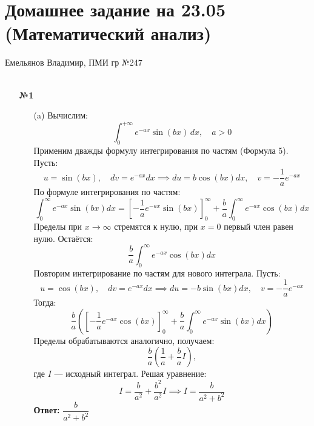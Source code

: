 \documentclass[a4paper]{article}
\begin{document}
\section*{Домашнее задание на 23.05 (Математический анализ)}
{\large Емельянов Владимир, ПМИ гр №247}\\\\
\begin{enumerate}
  \item[\textbf{№1}]\begin{enumerate}
    \item[(a)]Вычислим:
    \[\displaystyle\int_{0}^{+\infty} e^{-ax} \sin(bx) \, dx, \quad a > 0\]
    Применим дважды формулу интегрирования по частям (Формула 5). Пусть:
    \[
    u = \sin(bx), \quad dv = e^{-ax} dx \implies du = b \cos(bx) dx, 
    \quad v = -\frac{1}{a} e^{-ax}
    \]
    По формуле интегрирования по частям:
    \[
    \int_{0}^{\infty} e^{-ax} \sin(bx) dx = 
    \left[ -\frac{1}{a} e^{-ax} \sin(bx) \right]_0^{\infty}
     + \frac{b}{a} \int_{0}^{\infty} e^{-ax} \cos(bx) dx
    \]
    Пределы при \(x \to \infty\) стремятся к нулю, при \(x=0\) первый член равен нулю. Остаётся:
    \[
    \frac{b}{a} \int_{0}^{\infty} e^{-ax} \cos(bx) dx
    \]
    Повторим интегрирование по частям для нового интеграла. Пусть:
    \[
    u = \cos(bx), \quad dv = e^{-ax} dx \implies du = -b 
    \sin(bx) dx, \quad v = -\frac{1}{a} e^{-ax}
    \]
    Тогда:
    \[
    \frac{b}{a} \left( \left[ -\frac{1}{a} e^{-ax} \cos(bx) 
    \right]_0^{\infty} + \frac{b}{a} \int_{0}^{\infty} e^{-ax} \sin(bx) dx \right)
    \]
    Пределы обрабатываются аналогично, получаем:
    \[
    \frac{b}{a} \left( \frac{1}{a} + \frac{b}{a} I \right),
    \]
    где \(I\) — исходный интеграл. Решая уравнение:
    \[
    I = \frac{b}{a^2} + \frac{b^2}{a^2} I \implies I = \frac{b}{a^2 + b^2}
    \]
    \textbf{Ответ:} \(\dfrac{b}{a^2 + b^2}\)\\


\end{enumerate}
\end{enumerate}
\end{document}
